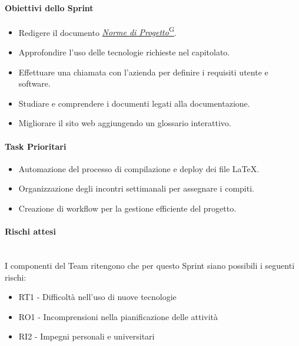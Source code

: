 \documentclass{article}
\begin{document}
                \paragraph{Obiettivi dello Sprint}
                    \begin{itemize}
                        \item Redigere il documento \href{https://code7crusaders.github.io/docs/PB/documentazione_interna/glossario.html#norme-di-progetto}{\emph{Norme di Progetto}\textsuperscript{G}}.
                        \item Approfondire l'uso delle tecnologie richieste nel capitolato.
                        \item Effettuare una chiamata con l'azienda per definire i requisiti utente e software.
                        \item Studiare e comprendere i documenti legati alla documentazione.
                        \item Migliorare il sito web aggiungendo un glossario interattivo.
                    \end{itemize}

                \paragraph{Task Prioritari}
                    \begin{itemize}
                        \item Automazione del processo di compilazione e deploy dei file LaTeX.
                        \item Organizzazione degli incontri settimanali per assegnare i compiti.
                        \item Creazione di workflow per la gestione efficiente del progetto.
                    \end{itemize}

                \paragraph{Rischi attesi}\mbox{}\\
                I componenti del Team ritengono che per questo Sprint siano possibili i seguenti rischi:
                \begin{itemize}
                    \item RT1 - Difficoltà nell’uso di nuove tecnologie
                    \item RO1 - Incomprensioni nella pianificazione delle attività
                    \item RI2 - Impegni personali e universitari
                \end{itemize}
\end{document}
